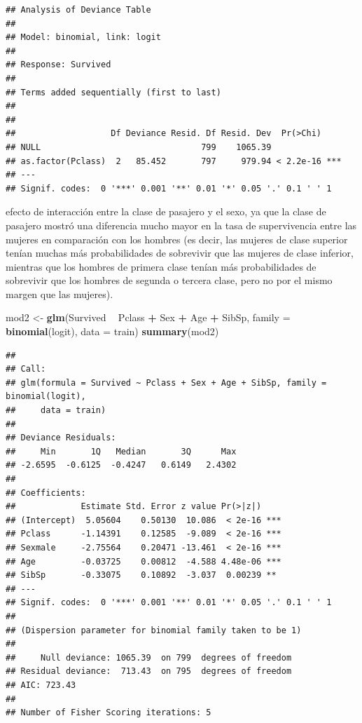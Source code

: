 \documentclass[]{book}
\newenvironment{Shaded}{\begin{snugshade}}{\end{snugshade}}
\newcommand{\KeywordTok}[1]{\textcolor[rgb]{0.13,0.29,0.53}{\textbf{#1}}}
\newcommand{\DataTypeTok}[1]{\textcolor[rgb]{0.13,0.29,0.53}{#1}}
\newcommand{\StringTok}[1]{\textcolor[rgb]{0.31,0.60,0.02}{#1}}
\newcommand{\OperatorTok}[1]{\textcolor[rgb]{0.81,0.36,0.00}{\textbf{#1}}}
\newcommand{\NormalTok}[1]{#1}
\begin{document}
\begin{verbatim}
## Analysis of Deviance Table
## 
## Model: binomial, link: logit
## 
## Response: Survived
## 
## Terms added sequentially (first to last)
## 
## 
##                   Df Deviance Resid. Df Resid. Dev  Pr(>Chi)    
## NULL                                799    1065.39              
## as.factor(Pclass)  2   85.452       797     979.94 < 2.2e-16 ***
## ---
## Signif. codes:  0 '***' 0.001 '**' 0.01 '*' 0.05 '.' 0.1 ' ' 1
\end{verbatim}

efecto de interacción entre la clase de pasajero y el sexo, ya que la
clase de pasajero mostró una diferencia mucho mayor en la tasa de
supervivencia entre las mujeres en comparación con los hombres (es
decir, las mujeres de clase superior tenían muchas más probabilidades de
sobrevivir que las mujeres de clase inferior, mientras que los hombres
de primera clase tenían más probabilidades de sobrevivir que los hombres
de segunda o tercera clase, pero no por el mismo margen que las
mujeres).

\begin{Shaded}
\begin{Highlighting}[]
\NormalTok{mod2 <-}\StringTok{ }\KeywordTok{glm}\NormalTok{(Survived }\OperatorTok{~}\StringTok{ }\NormalTok{Pclass }\OperatorTok{+}\StringTok{ }\NormalTok{Sex  }\OperatorTok{+}\StringTok{ }\NormalTok{Age }\OperatorTok{+}\StringTok{ }\NormalTok{SibSp, }\DataTypeTok{family =} \KeywordTok{binomial}\NormalTok{(logit), }\DataTypeTok{data =}\NormalTok{ train)}
\KeywordTok{summary}\NormalTok{(mod2)}
\end{Highlighting}
\end{Shaded}

\begin{verbatim}
## 
## Call:
## glm(formula = Survived ~ Pclass + Sex + Age + SibSp, family = binomial(logit), 
##     data = train)
## 
## Deviance Residuals: 
##     Min       1Q   Median       3Q      Max  
## -2.6595  -0.6125  -0.4247   0.6149   2.4302  
## 
## Coefficients:
##             Estimate Std. Error z value Pr(>|z|)    
## (Intercept)  5.05604    0.50130  10.086  < 2e-16 ***
## Pclass      -1.14391    0.12585  -9.089  < 2e-16 ***
## Sexmale     -2.75564    0.20471 -13.461  < 2e-16 ***
## Age         -0.03725    0.00812  -4.588 4.48e-06 ***
## SibSp       -0.33075    0.10892  -3.037  0.00239 ** 
## ---
## Signif. codes:  0 '***' 0.001 '**' 0.01 '*' 0.05 '.' 0.1 ' ' 1
## 
## (Dispersion parameter for binomial family taken to be 1)
## 
##     Null deviance: 1065.39  on 799  degrees of freedom
## Residual deviance:  713.43  on 795  degrees of freedom
## AIC: 723.43
## 
## Number of Fisher Scoring iterations: 5
\end{verbatim}
\end{document}
